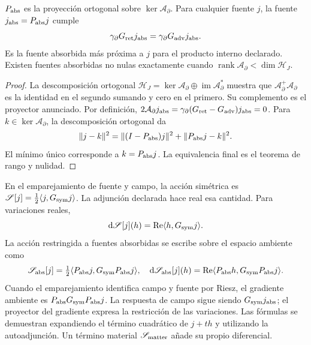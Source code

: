 \begin{theorem}
\label{vii:vii:thm:proyeccion-absorcion}
\(P_{\rm abs}\) es la proyección ortogonal sobre
\(\ker\mathcal A_\partial\). Para cualquier fuente \(j\), la fuente
\(j_{\rm abs}=P_{\rm abs}j\) cumple
\begin{equation}
 \gamma_\partial G_{\rm ret}j_{\rm abs}
 =\gamma_\partial G_{\rm adv}j_{\rm abs}.
 \label{vii:vii:eq:igualdad-borde-absorbido}
\end{equation}
Es la fuente absorbida más próxima a \(j\) para el producto interno
declarado. Existen fuentes absorbidas no nulas exactamente cuando
\(\operatorname{rank}\mathcal A_\partial<\dim\mathcal H_J\).
\end{theorem}
\begin{proof}
La descomposición ortogonal
\(\mathcal H_J=\ker\mathcal A_\partial\oplus
 \operatorname{im}\mathcal A_\partial^*\) muestra que
\(\mathcal A_\partial^+\mathcal A_\partial\) es la identidad
en el segundo sumando y cero en el primero. Su complemento es el
proyector anunciado. Por definición,
\(2\mathcal A_\partial j_{\rm abs}
 =\gamma_\partial(G_{\rm ret}-G_{\rm adv})j_{\rm abs}=0\).
Para \(k\in\ker\mathcal A_\partial\), la descomposición ortogonal da
\[
 \|j-k\|^2=\|(I-P_{\rm abs})j\|^2+\|P_{\rm abs}j-k\|^2.
\]
El mínimo único corresponde a \(k=P_{\rm abs}j\).
La equivalencia final es el teorema de rango y nulidad.
\end{proof}

En el emparejamiento de fuente y campo, la acción simétrica es
\(\mathscr S[j]=\tfrac12\langle j,G_{\rm sym}j\rangle\).
La adjunción declarada hace real esa cantidad. Para variaciones reales,
\[
 \mathrm d\mathscr S[j](h)
 =\operatorname{Re}\langle h,G_{\rm sym}j\rangle.
\]
La acción restringida a fuentes absorbidas se escribe sobre el espacio
ambiente como
\begin{equation}
 \mathscr S_{\rm abs}[j]
 =\tfrac12\langle P_{\rm abs}j,G_{\rm sym}P_{\rm abs}j\rangle,
 \quad
 \mathrm d\mathscr S_{\rm abs}[j](h)
 =\operatorname{Re}\langle P_{\rm abs}h,G_{\rm sym}P_{\rm abs}j\rangle.
 \label{vii:vii:eq:variacion-restringida-absorcion}
\end{equation}
Cuando el emparejamiento identifica campo y fuente por Riesz, el gradiente
ambiente es \(P_{\rm abs}G_{\rm sym}P_{\rm abs}j\).
La respuesta de campo sigue siendo \(G_{\rm sym}j_{\rm abs}\); el
proyector del gradiente expresa la restricción de las variaciones.
Las fórmulas se demuestran expandiendo el término cuadrático de
\(j+th\) y utilizando la autoadjunción. Un término material
\(\mathscr S_{\rm matter}\) añade su propio diferencial.

